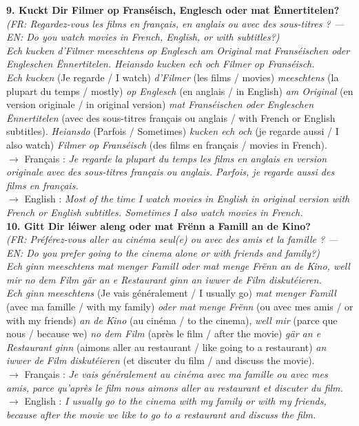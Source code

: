 \noindent\textbf{9. Kuckt Dir Filmer op Franséisch, Englesch oder mat Ënnertitelen?}\\
\textit{(FR: Regardez-vous les films en français, en anglais ou avec des sous-titres ? — EN: Do you watch movies in French, English, or with subtitles?)}\\[0.3em]
\textit{Ech kucken d'Filmer meeschtens op Englesch am Original mat Franséischen oder Engleschen Ënnertitelen. Heiansdo kucken ech och Filmer op Franséisch.}\\
\textit{Ech kucken} (Je regarde / I watch) \textit{d'Filmer} (les films / movies) \textit{meeschtens} (la plupart du temps / mostly) \textit{op Englesch} (en anglais / in English) \textit{am Original} (en version originale / in original version) \textit{mat Franséischen oder Engleschen Ënnertitelen} (avec des sous-titres français ou anglais / with French or English subtitles). \textit{Heiansdo} (Parfois / Sometimes) \textit{kucken ech och} (je regarde aussi / I also watch) \textit{Filmer op Franséisch} (des films en français / movies in French).\\
$\rightarrow$ Français : \textit{Je regarde la plupart du temps les films en anglais en version originale avec des sous-titres français ou anglais. Parfois, je regarde aussi des films en français.}\\
$\rightarrow$ English : \textit{Most of the time I watch movies in English in original version with French or English subtitles. Sometimes I also watch movies in French.}\\[0.8em]

\noindent\textbf{10. Gitt Dir léiwer aleng oder mat Frënn a Famill an de Kino?}\\
\textit{(FR: Préférez-vous aller au cinéma seul(e) ou avec des amis et la famille ? — EN: Do you prefer going to the cinema alone or with friends and family?)}\\[0.3em]
\textit{Ech ginn meeschtens mat menger Famill oder mat menge Frënn an de Kino, well mir no dem Film gär an e Restaurant ginn an iwwer de Film diskutéieren.}\\
\textit{Ech ginn meeschtens} (Je vais généralement / I usually go) \textit{mat menger Famill} (avec ma famille / with my family) \textit{oder mat menge Frënn} (ou avec mes amis / or with my friends) \textit{an de Kino} (au cinéma / to the cinema), \textit{well mir} (parce que nous / because we) \textit{no dem Film} (après le film / after the movie) \textit{gär an e Restaurant ginn} (aimons aller au restaurant / like going to a restaurant) \textit{an iwwer de Film diskutéieren} (et discuter du film / and discuss the movie).\\
$\rightarrow$ Français : \textit{Je vais généralement au cinéma avec ma famille ou avec mes amis, parce qu'après le film nous aimons aller au restaurant et discuter du film.}\\
$\rightarrow$ English : \textit{I usually go to the cinema with my family or with my friends, because after the movie we like to go to a restaurant and discuss the film.}\\[0.8em]

